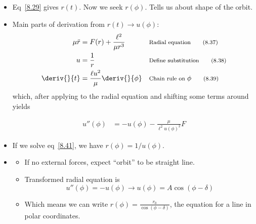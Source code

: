 \documentclass[10pt, twocolumn]{article}
\DeclareRobustCommand{\mybox}[2][gray!20]{%
	\begin{tcolorbox}[   %
		breakable,
		left=0pt,
		right=0pt,
		top=-13pt,
		bottom=0pt,
		colback=#1,
		colframe=#1,
		width=0.45\dimexpr\textwidth\relax,
		enlarge left by=0mm,
		boxsep=1pt,
		arc=0pt,outer arc=0pt,
		]
		#2
	\end{tcolorbox}
}
\newcommand{\rddot}{\ddot{r}}
\newcommand\ddphi[1]{\deriv{#1}{\phi}}
\newcommand\ddt[1]{\deriv{#1}{t}}
\newcommand\tlab[1]{\tag{#1}\label{#1}}
\begin{document}
\subsection{}
\begin{itemize}
	\item Eq~\ref{8.29} gives $r(t)$. Now we seek $r(\phi)$. Tells us about shape of the orbit. 
	\item Main parts of derivation from $r(t) \rightarrow u(\phi)$:
	\begin{align}
		\mu \rddot &= F(r) + \frac{\ell^2}{\mu r^3} && \footnotesize{\text{Radial equation}} \tlab{8.37} \\
		u &= \frac{1}{r} && \footnotesize{\text{Define substitution}} \tlab{8.38} \\
		\ddt{} &= \frac{\ell u^2}{\mu} \ddphi{} &&  \footnotesize{\text{Chain rule on }\phi} \tlab{8.39} \\
	\end{align}
	which, after applying to the radial equation and shifting some terms around yields \mybox[gray!20]{
	\begin{align}
		u''(\phi) &= -u(\phi) - \frac{\mu}{\ell^2 u(\phi)^2}F \tlab{8.41}
	\end{align}}
	\item If we solve eq~\ref{8.41}, we have $r(\phi) = 1/u(\phi)$. 
	\item {}
	\begin{footnotesize}
	\begin{itemize}
		\item If no external forces, expect ``orbit'' to be straight line. 
		\item Transformed radial equation is 
		\begin{equation}
			u''(\phi) = -u(\phi) \rightarrow u(\phi) = A\cos(\phi-\delta) \tlab{8.42}
		\end{equation}
		\item Which means we can write $r(\phi) = \tfrac{r_0}{\cos(\phi-\delta)}$, the equation for a line in polar coordinates.
	\end{itemize}
	\end{footnotesize}
\end{itemize}
%
% 
\end{document}
